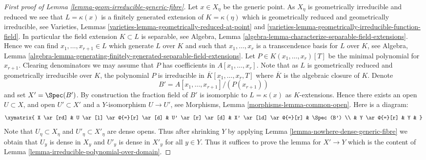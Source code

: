 \begin{proof}[First proof of Lemma \ref{lemma-geom-irreducible-generic-fibre}]
\medskip\noindent
Let $x \in X_\eta$ be the generic point. As $X_\eta$ is geometrically
irreducible and reduced we see that $L = \kappa(x)$ is a finitely generated
extension of $K = \kappa(\eta)$ which is geometrically reduced and
geometrically irreducible, see
Varieties, Lemmas \ref{varieties-lemma-geometrically-reduced-at-point} and
\ref{varieties-lemma-geometrically-irreducible-function-field}.
In particular the field extension $K \subset L$ is separable, see
Algebra, Lemma \ref{algebra-lemma-characterize-separable-field-extensions}.
Hence we can find $x_1, \ldots, x_{r + 1} \in L$ which generate $L$
over $K$ and such that $x_1, \ldots, x_r$ is a transcendence basis for
$L$ over $K$, see
Algebra, Lemma
\ref{algebra-lemma-generating-finitely-generated-separable-field-extensions}.
Let $P \in K(x_1, \ldots, x_r)[T]$ be the minimal polynomial for
$x_{r + 1}$. Clearing denominators we may assume that
$P$ has coefficients in $A[x_1, \ldots, x_r]$.
Note that as $L$ is geometrically reduced and geometrically irreducible
over $K$, the polynomial $P$ is irreducible in
$\overline{K}[x_1, \ldots, x_r, T]$ where $\overline{K}$ is the
algebraic closure of $K$. Denote
$$
B' = A[x_1, \ldots, x_{r + 1}]/(P(x_{r + 1}))
$$
and set $X' = \Spec(B')$. By construction the fraction field of $B'$
is isomorphic to $L = \kappa(x)$ as $K$-extensions. Hence there exists an
open $U \subset X$, and open $U' \subset X'$ and a $Y$-isomorphism
$U \to U'$, see
Morphisms, Lemma \ref{morphisms-lemma-common-open}.
Here is a diagram:
$$
\xymatrix{
X \ar[rd] &
U \ar[l] \ar@{=}[r] \ar[d] &
U' \ar[r] \ar[d] &
X' \ar[ld] \ar@{=}[r] & \Spec(B') \\
& Y \ar@{=}[r] & Y &
}
$$
Note that $U_\eta \subset X_\eta$ and $U'_\eta \subset X'_\eta$ are
dense opens. Thus after shrinking $Y$ by applying
Lemma \ref{lemma-nowhere-dense-generic-fibre}
we obtain that $U_y$ is dense in $X_y$ and $U'_y$ is dense in $X'_y$
for all $y \in Y$. Thus it suffices to prove the lemma for
$X' \to Y$ which is the content of
Lemma \ref{lemma-irreducible-polynomial-over-domain}.
\end{proof}

